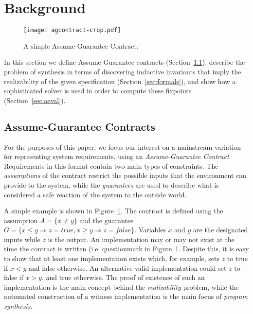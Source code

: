 \section{Background}
\label{sec:background}


\begin{figure}[!t]
\centering
\texttt{[image: agcontract-crop.pdf]}
\caption{A simple Assume-Guarantee Contract.}
\label{fg:agcontract}
\end{figure}


In this section we define Assume-Guarantee contracts (Section~\ref{sec:pre}),
describe the problem of synthesis in terms of discovering inductive invariants that imply the realizability of the given specification (Section~\ref{sec:formals}), and show how a sophisticated solver is used in order to compute these fixpoints (Section~\ref{sec:aeval}).

\subsection{Assume-Guarantee Contracts}
\label{sec:pre}

For the purposes of this paper, we focus our interest on a mainstream variation
for representing system requirements, using an \textit{Assume-Guarantee
Contract}. Requirements in this format contain two main types of constraints.
The \emph{assumptions} of the contract restrict the possible inputs that the
environment can provide to the system, while the \emph{guarantees} are used to
describe what is considered a safe reaction of the system to the outside world.

A simple example is shown in Figure~\ref{fg:agcontract}. The contract is defined using the assumption $A = \{x\neq
y\}$ and the guarantee $G = \{x \leq y \Rightarrow z =
\textit{true}, x \geq y \Rightarrow z = \textit{false}\}$. Variables
$x$ and $y$ are the designated inputs while $z$ is the output. An implementation may or may not exist at the time the contract is written (i.e. questionmark in Figure~\ref{fg:agcontract}.
Despite this, it is easy to show that at least one implementation exists which, for example, sets $z$ to true if $x < y$ and false otherwise. An alternative
valid implementation could set $z$ to false if $x > y$, and true otherwise. The
proof of existence of such an implementation  is the main concept behind the
\emph{realizability} problem, while the automated construction of a witness
implementation is the main focus of \emph{program synthesis}.


